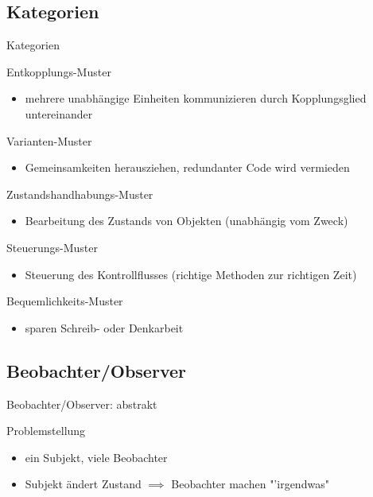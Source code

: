 \documentclass[18pt]{beamer}
\begin{document}
	\subsection{Kategorien}
		\begin{frame}{Kategorien}
			\begin{block}{Entkopplungs-Muster}
				\begin{itemize}
					\item mehrere unabhängige Einheiten kommunizieren durch Kopplungsglied untereinander
				\end{itemize}
			\end{block}
			\begin{block}{Varianten-Muster}
				\begin{itemize}
					\item Gemeinsamkeiten herausziehen, redundanter Code wird vermieden
				\end{itemize}
			\end{block}
			\begin{block}{Zustandshandhabungs-Muster}
				\begin{itemize}
					\item Bearbeitung des Zustands von Objekten (unabhängig vom Zweck)
				\end{itemize}
			\end{block}
			\begin{block}{Steuerungs-Muster}
				\begin{itemize}
					\item Steuerung des Kontrollflusses (richtige Methoden zur richtigen Zeit)
				\end{itemize}
			\end{block}
			\begin{block}{Bequemlichkeits-Muster}
				\begin{itemize}
					\item sparen Schreib- oder Denkarbeit
				\end{itemize}
			\end{block}
		\end{frame}

	\subsection{Beobachter/Observer}
		\begin{frame}{Beobachter/Observer: abstrakt}
			\begin{exampleblock}{Problemstellung}
				\begin{itemize}
					\item ein Subjekt, viele Beobachter
					\item Subjekt ändert Zustand $\implies$ Beobachter machen "'irgendwas"
				\end{itemize}		
			\end{exampleblock}
		\end{frame}
		
\end{document}
